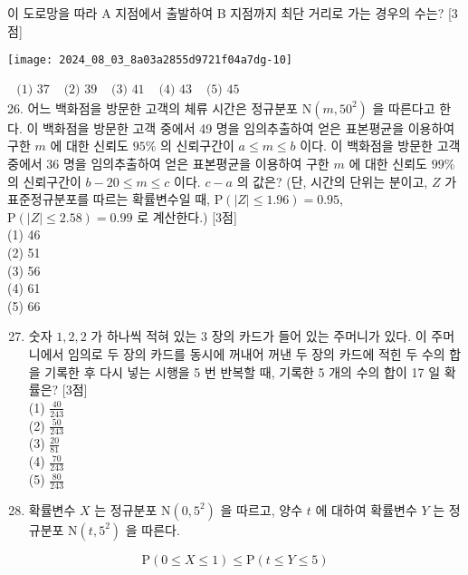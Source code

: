 \documentclass[10pt]{article}
\begin{document}
이 도로망을 따라 A 지점에서 출발하여 B 지점까지 최단 거리로 가는 경우의 수는? [3점]

\begin{center}
\texttt{[image: 2024\_08\_03\_8a03a2855d9721f04a7dg-10]}
\end{center}

\(\begin{array}{lllll}\text { (1) } 37 & \text { (2) } 39 & \text { (3) } 41 & \text { (4) } 43 & \text { (5) } 45\end{array}\)\\
26. 어느 백화점을 방문한 고객의 체류 시간은 정규분포 \(\mathrm{N}\left(m, 50^{2}\right)\) 을 따른다고 한다. 이 백화점을 방문한 고객 중에서 49 명을 임의추출하여 얻은 표본평균을 이용하여 구한 \(m\) 에 대한 신뢰도 \(95 \%\) 의 신뢰구간이 \(a \leq m \leq b\) 이다. 이 백화점을 방문한 고객 중에서 36 명을 임의추출하여 얻은 표본평균을 이용하여 구한 \(m\) 에 대한 신뢰도 \(99 \%\) 의 신뢰구간이 \(b-20 \leq m \leq c\) 이다. \(c-a\) 의 값은? (단, 시간의 단위는 분이고, \(Z\) 가 표준정규분포를 따르는 확률변수일 때, \(\mathrm{P}(|Z| \leq 1.96)=0.95\), \(\mathrm{P}(|Z| \leq 2.58)=0.99\) 로 계산한다.) [3점]\\
(1) 46\\
(2) 51\\
(3) 56\\
(4) 61\\
(5) 66

\begin{enumerate}
  \setcounter{enumi}{26}
  \item 숫자 \(1,2,2\) 가 하나씩 적혀 있는 3 장의 카드가 들어 있는 주머니가 있다. 이 주머니에서 임의로 두 장의 카드를 동시에 꺼내어 꺼낸 두 장의 카드에 적힌 두 수의 합을 기록한 후 다시 넣는 시행을 5 번 반복할 때, 기록한 5 개의 수의 합이 17 일 확률은? [3점]\\
(1) \(\frac{40}{243}\)\\
(2) \(\frac{50}{243}\)\\
(3) \(\frac{20}{81}\)\\
(4) \(\frac{70}{243}\)\\
(5) \(\frac{80}{243}\)

  \item 확률변수 \(X\) 는 정규분포 \(\mathrm{N}\left(0,5^{2}\right)\) 을 따르고, 양수 \(t\) 에 대하여 확률변수 \(Y\) 는 정규분포 \(\mathrm{N}\left(t, 5^{2}\right)\) 을 따른다.

\end{enumerate}

\[
\mathrm{P}(0 \leq X \leq 1) \leq \mathrm{P}(t \leq Y \leq 5)
\]
\end{document}
